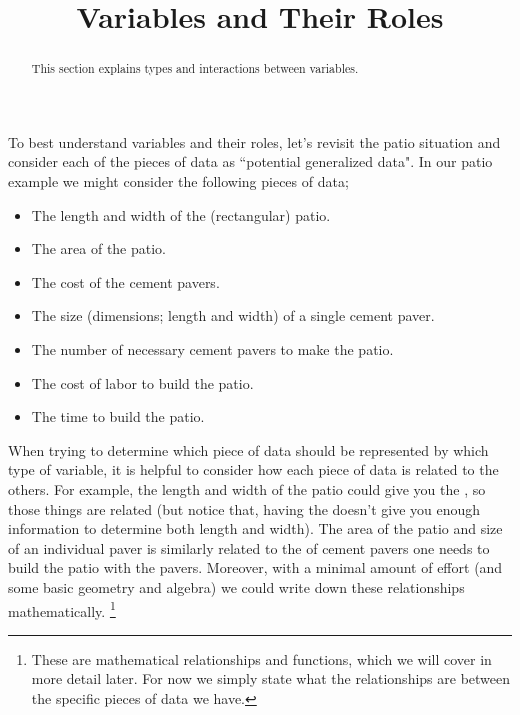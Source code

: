 \documentclass{ximeraXloud}
\title{Variables and Their Roles}
\begin{document}
\begin{abstract}
    This section explains types and interactions between variables.
\end{abstract}
\maketitle

To best understand variables and their roles, let's revisit the patio situation and consider each of the pieces of data as ``potential generalized data". In our patio example we might consider the following pieces of data;
\begin{itemize}
    \item The length and width of the (rectangular) patio.
    \item The area of the patio.
    \item The cost of the cement pavers.
    \item The size (dimensions; length and width) of a single cement paver.
    \item The number of necessary cement pavers to make the patio.
    \item The cost of labor to build the patio.
    \item The time to build the patio.
\end{itemize}

\begin{example}
    When trying to determine which piece of data should be represented by which type of variable, it is helpful to consider how each piece of data is related to the others. For example, the length and width of the patio could give you the , so those things are related (but notice that, having the  doesn't give you enough information to determine both length and width). The area of the patio and size of an individual paver is similarly related to the  of cement pavers one needs to build the patio with the pavers. Moreover, with a minimal amount of effort (and some basic geometry and algebra) we could write down these relationships mathematically.
    \footnote{These are mathematical relationships and functions, which we will cover in more detail later. For now we simply state what the relationships are between the specific pieces of data we have.}
\end{example}
\end{document}
